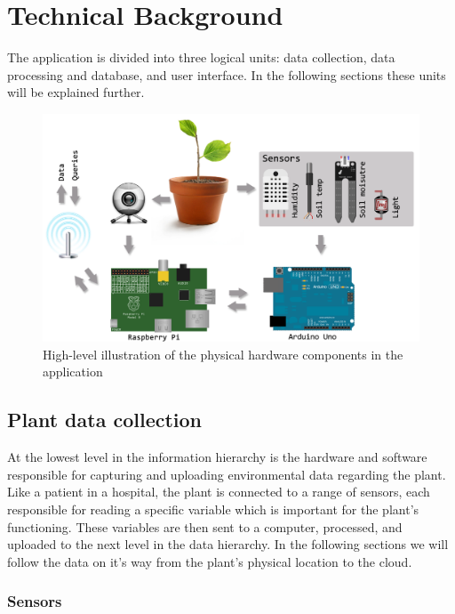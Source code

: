 \chapter{Technical Background}

The application is divided into three logical units: data collection, data processing and database, and user interface. In the following sections these units will be explained further. 

\begin{figure}
\centering
\includegraphics[width=1\textwidth]{img/hardware/application.png}
\caption{High-level illustration of the physical hardware components in the application}
\label{fig:application}
\end{figure}

\section{Plant data collection}
At the lowest level in the information hierarchy is the hardware and software responsible for capturing and uploading environmental data regarding the plant. Like a patient in a hospital, the plant is connected to a range of sensors, each responsible for reading a specific variable which is important for the plant’s functioning. These variables are then sent to a computer, processed, and uploaded to the next level in the data hierarchy. In the following sections we will follow the data on it’s way from the plant’s physical location to the cloud.

\subsection{Sensors}

